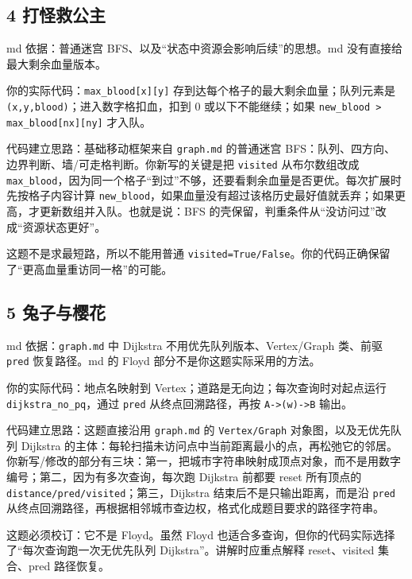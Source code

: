 \documentclass[10pt,a4paper,fontset=none]{ctexart}
\begin{document}
\subsection{4 打怪救公主}
\begin{sourcebox}
md 依据：普通迷宫 BFS、以及“状态中资源会影响后续”的思想。md 没有直接给最大剩余血量版本。
\end{sourcebox}
\begin{methodbox}
你的实际代码：\texttt{max\_blood[x][y]} 存到达每个格子的最大剩余血量；队列元素是 \texttt{(x,y,blood)}；进入数字格扣血，扣到 0 或以下不能继续；如果 \texttt{new\_blood > max\_blood[nx][ny]} 才入队。

代码建立思路：基础移动框架来自 \texttt{graph.md} 的普通迷宫 BFS：队列、四方向、边界判断、墙/可走格判断。你新写的关键是把 \texttt{visited} 从布尔数组改成 \texttt{max\_blood}，因为同一个格子“到过”不够，还要看剩余血量是否更优。每次扩展时先按格子内容计算 \texttt{new\_blood}，如果血量没有超过该格历史最好值就丢弃；如果更高，才更新数组并入队。也就是说：BFS 的壳保留，判重条件从“没访问过”改成“资源状态更好”。
\end{methodbox}
这题不是求最短路，所以不能用普通 \texttt{visited=True/False}。你的代码正确保留了“更高血量重访同一格”的可能。

\subsection{5 兔子与樱花}
\begin{sourcebox}
md 依据：\texttt{graph.md} 中 Dijkstra 不用优先队列版本、Vertex/Graph 类、前驱 \texttt{pred} 恢复路径。md 的 Floyd 部分不是你这题实际采用的方法。
\end{sourcebox}
\begin{methodbox}
你的实际代码：地点名映射到 Vertex；道路是无向边；每次查询时对起点运行 \texttt{dijkstra\_no\_pq}，通过 \texttt{pred} 从终点回溯路径，再按 \texttt{A->(w)->B} 输出。

代码建立思路：这题直接沿用 \texttt{graph.md} 的 \texttt{Vertex/Graph} 对象图，以及无优先队列 Dijkstra 的主体：每轮扫描未访问点中当前距离最小的点，再松弛它的邻居。你新写/修改的部分有三块：第一，把城市字符串映射成顶点对象，而不是用数字编号；第二，因为有多次查询，每次跑 Dijkstra 前都要 reset 所有顶点的 \texttt{distance/pred/visited}；第三，Dijkstra 结束后不是只输出距离，而是沿 \texttt{pred} 从终点回溯路径，再根据相邻城市查边权，格式化成题目要求的路径字符串。
\end{methodbox}
这题必须校订：它不是 Floyd。虽然 Floyd 也适合多查询，但你的代码实际选择了“每次查询跑一次无优先队列 Dijkstra”。讲解时应重点解释 reset、visited 集合、pred 路径恢复。
\end{document}
